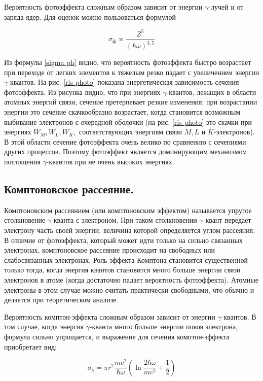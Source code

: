 \documentclass[a4paper,12pt]{report}
\begin{document}
	
	Вероятность фотоэффекта сложным образом зависит от энергии
	$\gamma$-лучей и от заряда ядер. Для оценок можно пользоваться формулой
	
	\begin{equation}\label{sigma ph}
	\sigma_{\text{ф}} \propto \dfrac{Z^5}{(\hbar\omega)^{3,5}}
	\end{equation}
	
	Из формулы \eqref{sigma ph} видно, что вероятность фотоэффекта быстро возрастает при переходе от легких элементов к тяжелым резко падает с увеличением энергии $\gamma$-квантов. На рис. \ref{ris photo} показана энергетическая зависимость сечения фотоэффекта. Из рисунка видно, что при энергиях $\gamma$-квантов, лежащих в области атомных энергий связи, сечение претерпевает резкие изменения: при возрастании энергии это сечение скачкообразно возрастает, когда становится возможным выбивание электронов с очередной оболочки (на рис. \ref{ris photo} это скачки при энергиях $ W_M, W_L, W_K, $ соответствующих энергиям связи $ M, L $  и $ K $-электронов). В этой области сечение фотоэффекта очень велико по сравнению с сечениями других процессов. Поэтому фотоэффект является доминирующим механизмом поглощения $\gamma$-квантов при не очень высоких энергиях.
	
	\subsection*{Комптоновское рассеяние.} Комптоновским рассеянием (или комптоновским эффектом) называется упругое столкновение $\gamma$-кванта с электроном. При таком столкновении $\gamma$-квант передает электрону часть своей энергии, величина которой определяется углом рассеяния. В отличие от фотоэффекта, который может идти только на сильно связанных электронах, комптоновское рассеяние происходит на свободных или слабосвязанных электронах. Роль эффекта Комптона становится
	существенной только тогда, когда энергия квантов становится много
	больше энергии связи электронов в атоме (когда достаточно падает
	вероятность фотоэффекта). Атомные электроны в этом случае можно
	считать практически свободными, что обычно и делается при теоретическом анализе.
	
	Вероятность комптон-эффекта сложным образом зависит от энергии $\gamma$-квантов. В том случае, когда энергия
	$\gamma$-кванта много больше энергии покоя электрона, формула сильно
	упрощается, и выражение для сечения комптон-эффекта приобретает  вид:
	
	\begin{equation}\label{sigma k}
	\sigma_{\text{к}} = \pi r^2 \dfrac{mc^2}{\hbar\omega} \left( \ln{\dfrac{2\hbar\omega}{mc^2} + \dfrac{1}{2}} \right) 
	\end{equation}
	
\end{document}
